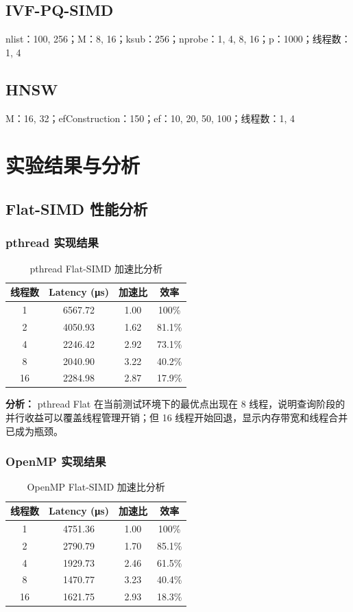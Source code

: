 \documentclass[a4paper]{article}
\begin{document}
\subsection{IVF-PQ-SIMD}
nlist：100, 256；M：8, 16；ksub：256；nprobe：1, 4, 8, 16；p：1000；线程数：1, 4

\subsection{HNSW}
M：16, 32；efConstruction：150；ef：10, 20, 50, 100；线程数：1, 4

\section{实验结果与分析}

\subsection{Flat-SIMD 性能分析}

\subsubsection{pthread 实现结果}

\begin{table}[htbp]
\centering
\caption{pthread Flat-SIMD 加速比分析}
\begin{tabular}{cccc}
\toprule
线程数 & Latency (μs) & 加速比 & 效率 \\
\midrule
1 & 6567.72 & 1.00 & 100\% \\
2 & 4050.93 & 1.62 & 81.1\% \\
4 & 2246.42 & 2.92 & 73.1\% \\
8 & 2040.90 & 3.22 & 40.2\% \\
16 & 2284.98 & 2.87 & 17.9\% \\
\bottomrule
\end{tabular}
\end{table}

\textbf{分析：} pthread Flat 在当前测试环境下的最优点出现在 8 线程，说明查询阶段的并行收益可以覆盖线程管理开销；但 16 线程开始回退，显示内存带宽和线程合并已成为瓶颈。

\subsubsection{OpenMP 实现结果}

\begin{table}[htbp]
\centering
\caption{OpenMP Flat-SIMD 加速比分析}
\begin{tabular}{cccc}
\toprule
线程数 & Latency (μs) & 加速比 & 效率 \\
\midrule
1 & 4751.36 & 1.00 & 100\% \\
2 & 2790.79 & 1.70 & 85.1\% \\
4 & 1929.73 & 2.46 & 61.5\% \\
8 & 1470.77 & 3.23 & 40.4\% \\
16 & 1621.75 & 2.93 & 18.3\% \\
\bottomrule
\end{tabular}
\end{table}
\end{document}
